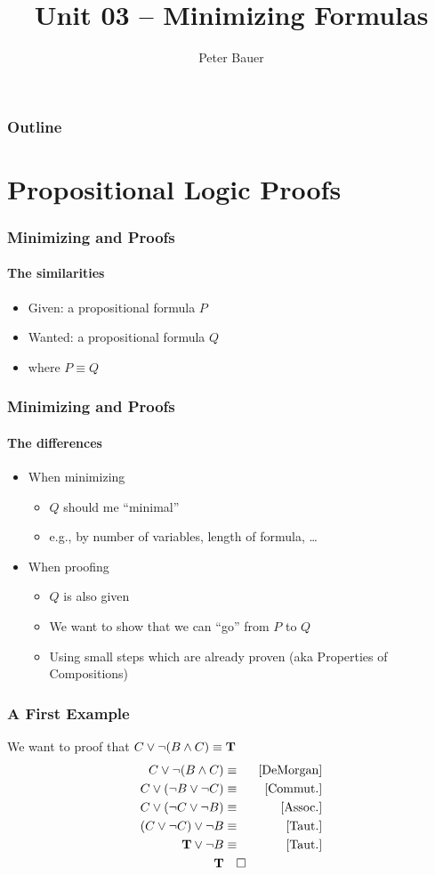 \documentclass{beamer}
\title{Unit 03 – Minimizing Formulas}
\author{Peter Bauer}
\date{} %
\theoremstyle{remark}
\begin{document}
\frame{\titlepage}

\begin{frame}
	\frametitle{Outline}
	\tableofcontents
\end{frame}

\section{Propositional Logic Proofs}
\begin{frame}
	\frametitle{Minimizing and Proofs}
	\framesubtitle{The similarities}
	\begin{itemize}
		\item Given: a propositional formula $P$
		\item Wanted: a propositional formula $Q$
		\item where $P \equiv Q$
	\end{itemize}
\end{frame}

\begin{frame}
	\frametitle{Minimizing and Proofs}
	\framesubtitle{The differences}
	\begin{itemize}
		\item When minimizing
		\begin{itemize}
			\item $Q$ should me ``minimal''
			\item e.g., by number of variables, length of formula, \ldots
		\end{itemize}
		\item When proofing
		\begin{itemize}
			\item $Q$ is also given
			\item We want to show that we can ``go'' from $P$ to $Q$
			\item Using small steps which are already proven (aka Properties of Compositions)
		\end{itemize}
	\end{itemize}
\end{frame}
\begin{frame}
	\frametitle{A First Example}
	We want to proof that $C \lor \lnot(B \land C) \equiv \text{{\bf T}}$
	\pause
	\begin{align}
		C \lor \lnot(B \land C)  & \equiv & \text{[DeMorgan]} \\
		C \lor (\lnot B \lor \lnot C) & \equiv & \text{[Commut.]} \\
		C \lor (\lnot C \lor \lnot B) & \equiv & \text{[Assoc.]} \\
		(C \lor \lnot C) \lor \lnot B & \equiv & \text{[Taut.]} \\
		\text{{\bf T}} \lor \lnot B & \equiv & \text{[Taut.]} \\
		\text{{\bf T}} & \hspace{1em}\square
	\end{align}
\end{frame}
\end{document}
